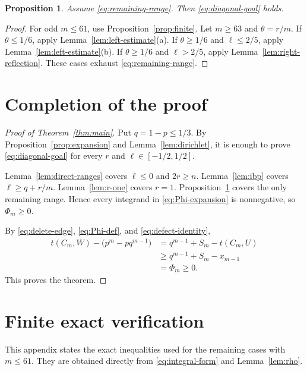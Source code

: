 \documentclass[11pt]{article}
\numberwithin{equation}{section}
\newtheorem{proposition}[theorem]{Proposition}
\begin{document}
\begin{proposition}\label{prop:remaining}
Assume \eqref{eq:remaining-range}. Then \eqref{eq:diagonal-goal} holds.
\end{proposition}

\begin{proof}
For odd $m\le61$, use Proposition~\ref{prop:finite}. Let $m\ge63$ and $\theta=r/m$. If $\theta\le1/6$, apply Lemma~\ref{lem:left-estimate}(a). If $\theta\ge1/6$ and $\ell\le2/5$, apply Lemma~\ref{lem:left-estimate}(b). If $\theta\ge1/6$ and $\ell>2/5$, apply Lemma~\ref{lem:right-reflection}. These cases exhaust \eqref{eq:remaining-range}.
\end{proof}

\section{Completion of the proof}

\begin{proof}[Proof of Theorem~\ref{thm:main}]
Put $q=1-p\le1/3$. By Proposition~\ref{prop:expansion} and Lemma~\ref{lem:dirichlet}, it is enough to prove \eqref{eq:diagonal-goal} for every $r$ and $\ell\in[-1/2,1/2]$.

Lemma~\ref{lem:direct-ranges} covers $\ell\le0$ and $2r\ge n$. Lemma~\ref{lem:ibp} covers $\ell\ge q+r/m$. Lemma~\ref{lem:r-one} covers $r=1$. Proposition~\ref{prop:remaining} covers the only remaining range. Hence every integrand in \eqref{eq:Phi-expansion} is nonnegative, so $\Phi_m\ge0$.

By \eqref{eq:delete-edge}, \eqref{eq:Phi-def}, and \eqref{eq:defect-identity},
\[
\begin{aligned}
 t(C_m,W)-\bigl(p^m-pq^{m-1}\bigr)
 &=q^{m-1}+S_m-t(C_m,U)\\
 &\ge q^{m-1}+S_m-x_{m-1}\\
 &=\Phi_m\ge0.
\end{aligned}
\]
This proves the theorem.
\end{proof}

\appendix

\section{Finite exact verification}\label{app:finite}

This appendix states the exact inequalities used for the remaining cases with $m\le61$. They are obtained directly from \eqref{eq:integral-form} and Lemma~\ref{lem:rho}.
\end{document}
